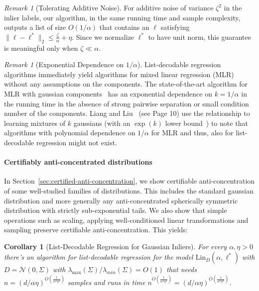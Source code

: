 \documentclass{article}
\newtheorem{corollary}[theorem]{Corollary}
\theoremstyle{definition}
\theoremstyle{remark}
\newtheorem{remark}[theorem]{Remark}
\newcommand{\cN}{\mathcal N}
\renewcommand{\leq}{\leqslant}
\numberwithin{equation}{section}
\newcommand{\1}{\bm{1}}
\newcommand{\Lin}{\mathrm{Lin}}
\begin{document}
\begin{remark}[Tolerating Additive Noise]
	For additive noise of variance $\zeta^2$ in the inlier labels, our algorithm, in the same running time and sample complexity, outputs a list of size $O(1/\alpha)$ that contains an $\ell$ satisfying $\|\ell-\ell^*\|_2 \leq \frac{\zeta}{\alpha} + \eta$. Since we normalize $\ell^*$ to have unit norm, this guarantee is meaningful only when $\zeta \ll \alpha$. %
\end{remark}

\begin{remark}[Exponential Dependence on $1/\alpha$]
	List-decodable regression algorithms immediately yield algorithms for mixed linear regression (MLR) without any assumptions on the components. The state-of-the-art algorithm for MLR with gaussian components~\cite{DBLP:conf/colt/LiL18} has an exponential dependence on $k=1/\alpha$ in the running time in the absence of strong pairwise separation or small condition number of the components. Liang and Liu~\cite{DBLP:conf/colt/LiL18} (see Page 10) use the relationship to learning mixtures of $k$ gaussians (with an $\exp(k)$ lower bound~\cite{DBLP:conf/focs/MoitraV10}) to note that algorithms with polynomial dependence on $1/\alpha$ for MLR and thus, also for list-decodable regression might not exist. 
\end{remark}


\paragraph{Certifiably anti-concentrated distributions} In Section~\ref{sec:certified-anti-concentration}, we show certifiable anti-concentration of some well-studied families of distributions. This includes the standard gaussian distribution and more generally any anti-concentrated spherically symmetric distribution with strictly sub-exponential tails. We also show that simple operations such as scaling, applying well-conditioned linear transformations and sampling preserve certifiable anti-concentration. This yields:
\begin{corollary}[List-Decodable Regression for Gaussian Inliers]
	For every $\alpha, \eta > 0$ there's an algorithm for list-decodable regression for the model $\Lin_D(\alpha,\ell^*)$ with $D = \cN(0,\Sigma)$ with $\lambda_{\max}(\Sigma)/\lambda_{min}(\Sigma) = O(1)$ that needs $n = (d/\alpha \eta)^{O\left(\frac{1}{\alpha^4 \eta^4}\right)}$  samples and runs in time $n^{O\left(\frac{1}{\alpha^4 \eta^4}\right)} = (d/\alpha \eta)^{O\left(\frac{1}{\alpha^8 \eta^8}\right)}$.
\end{corollary} 
\end{document}
